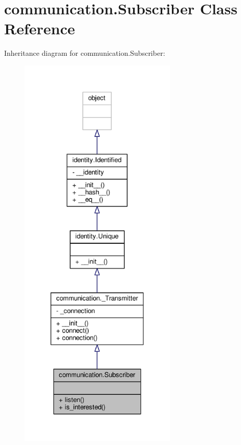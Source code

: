 \hypertarget{classcommunication_1_1Subscriber}{}\section{communication.\+Subscriber Class Reference}
\label{classcommunication_1_1Subscriber}


Inheritance diagram for communication.\+Subscriber\+:\nopagebreak
\begin{figure}[H]
\begin{center}
\leavevmode
\includegraphics[height=550pt]{classcommunication_1_1Subscriber__inherit__graph}
\end{center}
\end{figure}


